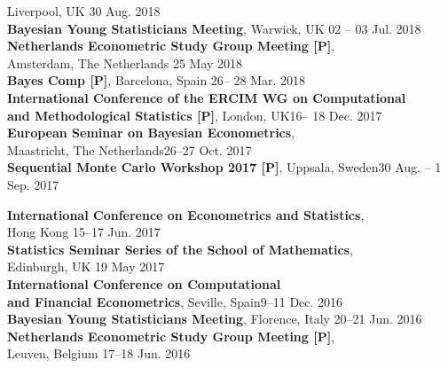 \documentclass[margin,line]{resume}
\begin{document}
\begin{resume}
	Liverpool, UK \hfill 30 Aug. 2018 \vspace{1mm} \\	
	\textbf{ Bayesian Young Statisticians Meeting}, Warwick, UK \hfill 02 -- 03 Jul. 2018 \vspace{1mm} \\
	\textbf{ Netherlands Econometric Study Group Meeting [P]}, \\
	Amsterdam, The Netherlands \hfill 25 May 2018  \vspace{1mm} \\ 
	\textbf{ Bayes Comp [P]}, Barcelona, Spain \hfill 26-- 28 Mar. 2018 \vspace{1mm} \\
	\textbf{ International Conference of the ERCIM WG on Computational}\\
	\textbf{and Methodological Statistics [P]}, London, UK\hfill 16-- 18 Dec. 2017 \vspace{1mm} \\ 	
	\textbf{ European Seminar on Bayesian Econometrics},\\
	 Maastricht, The Netherlands\hfill 26--27 Oct. 2017 \vspace{1mm} \\ 
	\textbf{Sequential Monte Carlo Workshop 2017 [P]}, Uppsala, Sweden\hfill 30 Aug. -- 1 Sep. 2017 \vspace{1mm} \\ 
		\newpage	

	\textbf{ International Conference on Econometrics and Statistics},\\ Hong Kong \hfill 15--17 Jun. 2017 \vspace{1mm} \\ 
    \textbf{Statistics Seminar Series of the School of Mathematics},\\ Edinburgh, UK \hfill 19 May 2017 \vspace{1mm} \\ 
    \textbf{ International Conference on Computational \\ and Financial Econometrics},  Seville, Spain\hfill 9--11 Dec. 2016  \vspace{1mm} \\ 
	\textbf{ Bayesian Young Statisticians Meeting}, Florence, Italy \hfill 20--21 Jun. 2016  \vspace{1mm} \\ 
	\textbf{ Netherlands Econometric Study Group Meeting [P]},\\
    Leuven, Belgium \hfill 17--18 Jun. 2016  \vspace{1mm} \\ 
  

\end{resume}
\end{document}
